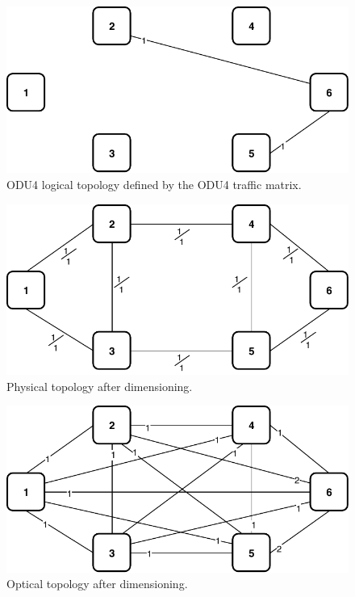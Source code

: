\begin{figure}[h!]
\centering
\includegraphics[width=12cm]{sdf/ilp/transparent_protection/figures/logical_topology_ODU4_low}
\caption{ODU4 logical topology defined by the ODU4 traffic matrix.}
\label{logical2_ODU4_protectionlow}
\end{figure}
\newpage
\begin{figure}[h!]
\centering
\includegraphics[width=13cm]{sdf/ilp/transparent_protection/figures/physical_topology}
\caption{Physical topology after dimensioning.}
\label{physical2_protectionlow}
\end{figure}

\vspace{17pt}
\begin{figure}[h!]
\centering
\includegraphics[width=13cm]{sdf/ilp/transparent_protection/figures/optical_topology_low}
\caption{Optical topology after dimensioning.}
\label{optical2_protectionlow}
\end{figure}

